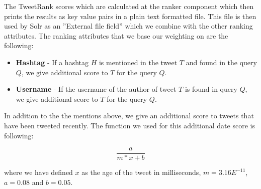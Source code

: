 The TweetRank scores which are calculated at the ranker component which then prints the results as key value pairs in a plain text formatted file. This file is then used by Solr as an ''External file field'' which we combine with the other ranking attributes. The ranking attributes that we base our weighting on are the following:

\begin{itemize}
	\item \textbf{Hashtag} - If a hashtag $H$ is mentioned in the tweet $T$ and found in the query $Q$, we give additional score to $T$ for the query $Q$.
	\item \textbf{Username} - If the username of the author of tweet $T$ is found in query $Q$, we give additional score to $T$ for the query $Q$.
\end{itemize}

In addition to the the mentions above, we give an additional score to tweets that have been tweeted recently. The function we used for this additional date score is following: 

\begin{equation}
\frac{a}{m*x+b}
\end{equation}

where we have defined $x$ as the age of the tweet in milliseconds, $m = 3.16E^{-11}$, $a = 0.08$ and $b = 0.05$. 
